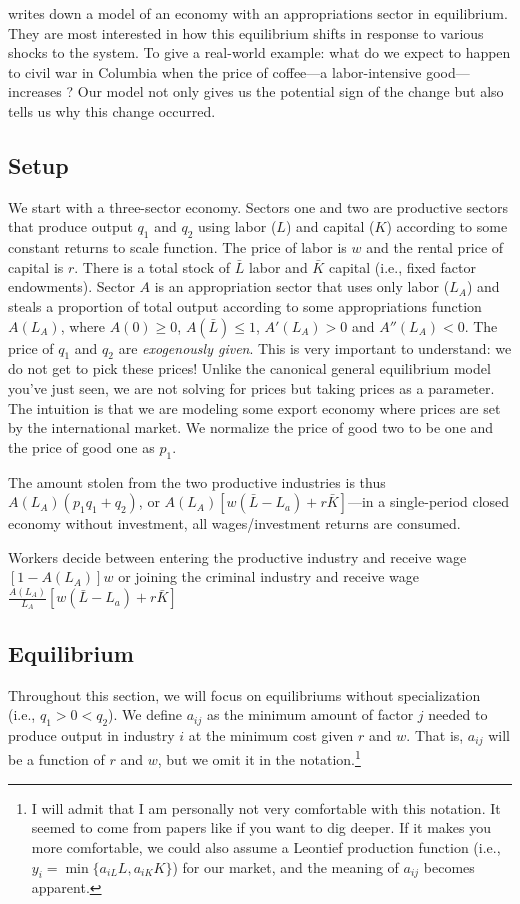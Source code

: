 \citet{dalbodalbo} writes down a model of an economy with an appropriations sector in equilibrium. They are most interested in how this equilibrium shifts in response to various shocks to the system. To give a real-world example: what do we expect to happen to civil war in Columbia when the price of coffee---a labor-intensive good---increases \citep{dube2013commodity}? Our model not only gives us the potential sign of the change but also tells us why this change occurred.
\subsection*{Setup}
We start with a three-sector economy. Sectors one and two are productive sectors that produce output $q_1$ and $q_2$ using labor ($L$) and capital ($K$) according to some constant returns to scale function. The price of labor is $w$ and the rental price of capital is $r$. There is a total stock of $\bar{L}$ labor and $\bar{K}$ capital (i.e., fixed factor endowments). Sector $A$ is an appropriation sector that uses only labor ($L_A$) and steals a proportion of total output according to some appropriations function $A(L_A)$, where $A(0) \geq 0$, $A(\bar{L}) \leq 1$, $A'(L_A) > 0$ and $A''(L_A) < 0$. The price of $q_1$ and $q_2$ are \emph{exogenously given}. This is very important to understand: we do not get to pick these prices! Unlike the canonical general equilibrium model you've just seen, we are not solving for prices but taking prices as a parameter. The intuition is that we are modeling some export economy where prices are set by the international market. We normalize the price of good two to be one and the price of good one as $p_1$.

The amount stolen from the two productive industries is thus $A(L_A)(p_1q_1 + q_2)$, or $A(L_A)[w(\bar{L} - L_a) + r\bar{K}]$---in a single-period closed economy without investment, all wages/investment returns are consumed.

Workers decide between entering the productive industry and receive wage $[1 - A(L_A)]w$ or joining the criminal industry and receive wage $\frac{A(L_A)}{L_A}[w(\bar{L} - L_a) + r\bar{K}]$
\subsection*{Equilibrium}
Throughout this section, we will focus on equilibriums without specialization (i.e., $q_1 > 0 < q_2$). We define $a_{ij}$ as the minimum amount of factor $j$ needed to produce output in industry $i$ at the minimum cost given $r$ and $w$. That is, $a_{ij}$ will be a function of $r$ and $w$, but we omit it in the notation.\footnote{I will admit that I am personally not very comfortable with this notation. It seemed to come from papers like \citet{Jones1965GE} if you want to dig deeper. If it makes you more comfortable, we could also assume a Leontief production function (i.e., $y_i = \min\{a_{iL}L, a_{iK}K\}$) for our market, and the meaning of $a_{ij}$ becomes apparent. } 

